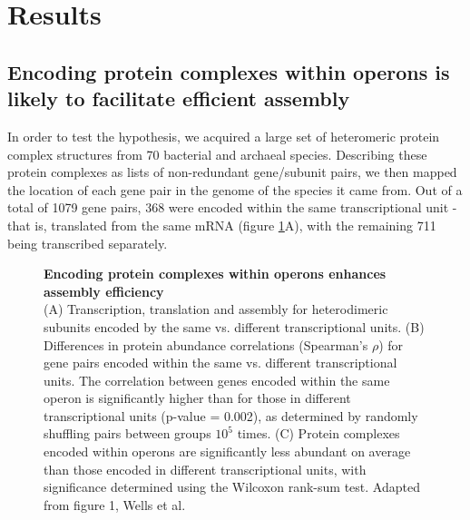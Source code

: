 \documentclass[a4paper,11pt,twoside,openright]{scrbook}
\begin{document}
\section{Results}
\subsection{Encoding protein complexes within operons is likely to facilitate efficient assembly}
In order to test the hypothesis, we acquired a large set of heteromeric protein
complex structures from 70 bacterial and archaeal species. Describing these
protein complexes as lists of non-redundant gene/subunit pairs, we then mapped
the location of each gene pair in the genome of the species it came from. Out of
a total of 1079 gene pairs, 368 were encoded within the same transcriptional
unit - that is, translated from the same mRNA (figure
\ref{figure:operonabundance}A), with the remaining 711 being transcribed
separately.

\begin{figure}
    \caption[Encoding protein complexes within operons enhances assembly
    efficiency]{\sffamily \textbf{Encoding protein complexes within operons
    enhances assembly efficiency} \\ \small (A) Transcription, translation and
    assembly for heterodimeric subunits encoded by the same vs. different
    transcriptional units. (B) Differences in protein abundance correlations
    (Spearman's \(\rho\)) for gene pairs encoded within the same vs. different
    transcriptional units. The correlation between genes encoded within the same
    operon is significantly higher than for those in different transcriptional
    units (p-value = 0.002), as determined by randomly shuffling pairs between
    groups \(10^{5}\) times. (C) Protein complexes encoded within operons are
    significantly less abundant on average than those encoded in different
    transcriptional units, with significance determined using the Wilcoxon
    rank-sum test. Adapted from figure 1, Wells et al. \cite{Wells2016}}
    \label{figure:operonabundance}
\end{figure}
\end{document}
